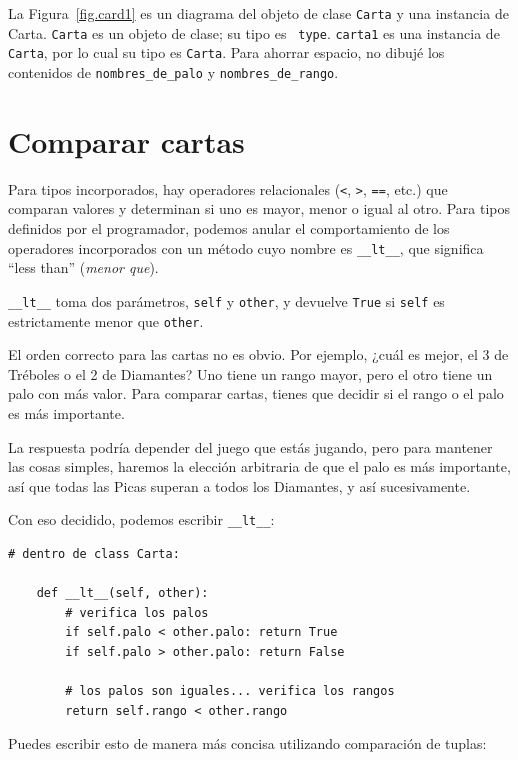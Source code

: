 \documentclass[10pt]{book}
\begin{document}
La Figura~\ref{fig.card1} es un diagrama del objeto de clase {\tt Carta} y
una instancia de Carta.  {\tt Carta} es un objeto de clase; su tipo es {\tt
  type}.  {\tt carta1} es una instancia de {\tt Carta}, por lo cual su tipo es
{\tt Carta}.  Para ahorrar espacio, no dibujé los contenidos de
\verb"nombres_de_palo" y \verb"nombres_de_rango".  
  


\section{Comparar cartas}
\label{comparecard}

Para tipos incorporados, hay operadores relacionales
({\tt <}, {\tt >}, {\tt ==}, etc.)
que comparan
valores y determinan si uno es mayor, menor o igual al
otro.  Para tipos definidos por el programador, podemos anular el comportamiento de
los operadores incorporados con un método cuyo nombre es
\verb"__lt__", que significa ``less than'' ({\em menor que}).

\verb"__lt__" toma dos parámetros, {\tt self} y {\tt other},
y devuelve {\tt True} si {\tt self} es estrictamente menor que {\tt other}.

El orden correcto para las cartas no es obvio.
Por ejemplo, ¿cuál
es mejor, el 3 de Tréboles o el 2 de Diamantes?  Uno tiene un rango
mayor, pero el otro tiene un palo con más valor.  Para comparar
cartas, tienes que decidir si el rango o el palo es más importante.

La respuesta podría depender del juego que estás jugando, pero para mantener
las cosas simples, haremos la elección arbitraria de que el palo es más
importante, así que todas las Picas superan a todos los Diamantes,
y así sucesivamente.

Con eso decidido, podemos escribir \verb"__lt__":

\begin{verbatim}
# dentro de class Carta:

    def __lt__(self, other):
        # verifica los palos
        if self.palo < other.palo: return True
        if self.palo > other.palo: return False

        # los palos son iguales... verifica los rangos
        return self.rango < other.rango
\end{verbatim}
%
Puedes escribir esto de manera más concisa utilizando comparación de tuplas:
\end{document}

